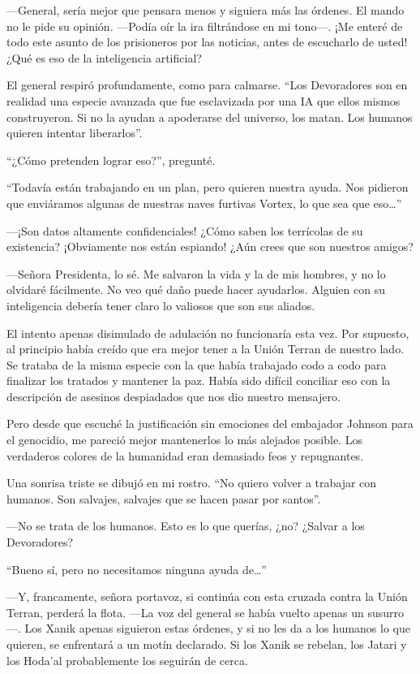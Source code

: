 —General, sería mejor que pensara menos y siguiera más las órdenes. El mando no le pide su opinión. —Podía oír la ira filtrándose en mi tono—. ¡Me enteré de todo este asunto de los prisioneros por las noticias, antes de escucharlo de usted! ¿Qué es eso de la inteligencia artificial?

El general respiró profundamente, como para calmarse. “Los Devoradores son en realidad una especie avanzada que fue esclavizada por una IA que ellos mismos construyeron. Si no la ayudan a apoderarse del universo, los matan. Los humanos quieren intentar liberarlos”.

“¿Cómo pretenden lograr eso?”, pregunté.

“Todavía están trabajando en un plan, pero quieren nuestra ayuda. Nos pidieron que enviáramos algunas de nuestras naves furtivas Vortex, lo que sea que eso…”

—¡Son datos altamente confidenciales! ¿Cómo saben los terrícolas de su existencia? ¡Obviamente nos están espiando! ¿Aún crees que son nuestros amigos?

—Señora Presidenta, lo sé. Me salvaron la vida y la de mis hombres, y no lo olvidaré fácilmente. No veo qué daño puede hacer ayudarlos. Alguien con su inteligencia debería tener claro lo valiosos que son sus aliados.

El intento apenas disimulado de adulación no funcionaría esta vez. Por supuesto, al principio había creído que era mejor tener a la Unión Terran de nuestro lado. Se trataba de la misma especie con la que había trabajado codo a codo para finalizar los tratados y mantener la paz. Había sido difícil conciliar eso con la descripción de asesinos despiadados que nos dio nuestro mensajero.

Pero desde que escuché la justificación sin emociones del embajador Johnson para el genocidio, me pareció mejor mantenerlos lo más alejados posible. Los verdaderos colores de la humanidad eran demasiado feos y repugnantes.

Una sonrisa triste se dibujó en mi rostro. “No quiero volver a trabajar con humanos. Son salvajes, salvajes que se hacen pasar por santos”.

—No se trata de los humanos. Esto es lo que querías, ¿no? ¿Salvar a los Devoradores?

“Bueno sí, pero no necesitamos ninguna ayuda de…”

—Y, francamente, señora portavoz, si continúa con esta cruzada contra la Unión Terran, perderá la flota. —La voz del general se había vuelto apenas un susurro—. Los Xanik apenas siguieron estas órdenes, y si no les da a los humanos lo que quieren, se enfrentará a un motín declarado. Si los Xanik se rebelan, los Jatari y los Hoda'al probablemente los seguirán de cerca.

